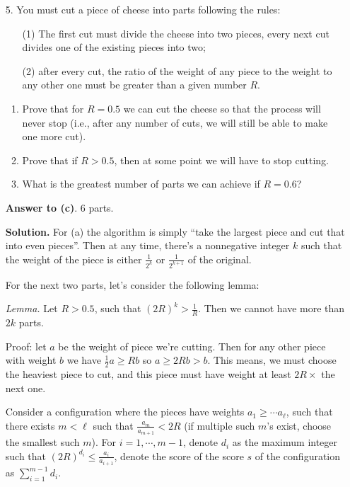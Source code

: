 \documentclass[11pt,a4paper]{article}
\begin{document}
\begin{enumerate}
	\item[5.]
	You must cut a piece of cheese into parts following the rules:
	\begin{itemize}
		\item[(1)] The first cut must divide
		the cheese into two pieces, every next cut divides one of the existing pieces into two;
		
		\item[(2)] after every cut, the ratio of the weight of any piece to the weight to any other one
		must be greater than a given number $R$. 
	\end{itemize}
    \begin{enumerate}
    	\item Prove that for $R = 0.5$ we can cut the cheese so that the process will never stop 
    	(i.e., after any number of cuts, we will still be able to make one more cut).
    	
    	\item Prove that if $R > 0.5$, then at some point we will have to stop cutting.
    	
    	\item What is the greatest number of parts we can achieve if $R = 0.6$?
    \end{enumerate}
    
    \textbf{Answer to (c)}. 6 parts. 
    
    \textbf{Solution.} For (a) the algorithm is simply 	``take the largest piece and cut that into even pieces''. 
    Then at any time, there's a nonnegative integer $k$ such that the weight of the piece is either $\frac{1}{2^k}$ or $\frac{1}{2^{k+1}}$ of the original. 
    
    For the next two parts, let's consider the following lemma: 
    
    \emph{Lemma.} Let $R>0.5$, such that $(2R)^k > \frac{1}{R}$. 
    Then we cannot have more than $2k$ parts. 
    
    Proof: let $a$ be the weight of piece we're cutting. Then for any other piece with weight $b$ we have 
    $\frac 12 a\ge Rb$ so $a\ge 2Rb > b$. 
    This means, we must choose the heaviest piece to cut, and this piece must have weight at least $2R\times$ the next one. 
    
    Consider a configuration where the pieces have weights 
    $a_1\ge \cdots a_{\ell}$, 
    such that there exists $m < \ell$ such that $\frac{a_m}{a_{m+1}} < 2R$ 
    (if multiple such $m$'s exist, choose the smallest such $m$). 
    For $i=1, \cdots, m-1$, denote $d_i$ as the maximum integer such that $(2R)^{d_i}\le \frac{a_i}{a_{i+1}}$, 
    denote the score of the score $s$ of the configuration as 
    $\sum_{i=1}^{m-1} d_i$. 
    

\end{enumerate}
\end{document}
